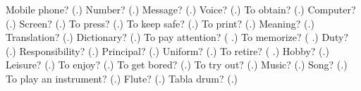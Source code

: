 \begin{tcolorbox}[breakable,colback=teal!4,colframe=teal!35!black,title={Before you move on}]
Mobile phone? (\textbf{}.) Number? (\textbf{}.) Message? (\textbf{}.) Voice? (\textbf{}.) To obtain? (\textbf{}.) Computer? (\textbf{}.) Screen? (\textbf{}.) To press? (\textbf{}.) To keep safe? (\textbf{}.) To print? (\textbf{}.) Meaning? (\textbf{}.) Translation? (\textbf{}.) Dictionary? (\textbf{}.) To pay attention? (\textbf{ }.) To memorize? (\textbf{ }.) Duty? (\textbf{}.) Responsibility? (\textbf{}.) Principal? (\textbf{}.) Uniform? (\textbf{}.) To retire? (\textbf{ }.) Hobby? (\textbf{}.) Leisure? (\textbf{}.) To enjoy? (\textbf{}.) To get bored? (\textbf{}.) To try out? (\textbf{}.) Music? (\textbf{}.) Song? (\textbf{}.) To play an instrument? (\textbf{}.) Flute? (\textbf{}.) Tabla drum? (\textbf{}.)
\end{tcolorbox}
